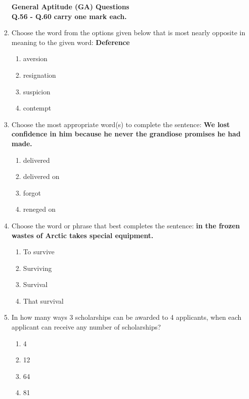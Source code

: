 \documentclass{article}
\begin{document}
\begin{enumerate}
\textbf{General Aptitude (GA) Questions}\\

\textbf{Q.56 - Q.60 carry one mark each.}


\item Choose the word from the options given below that is most nearly opposite in meaning to the given word: \textbf{Deference}
\begin{enumerate}
\item aversion
\item resignation
\item suspicion
\item contempt
\end{enumerate}

\item Choose the most appropriate word(s) to complete the sentence: \textbf{We lost confidence in him because he never \underline{\hspace{2cm}} the grandiose promises he had made.}
\begin{enumerate}
\item delivered
\item delivered on
\item forgot
\item reneged on
\end{enumerate}

\item Choose the word or phrase that best completes the sentence: \underline{\hspace{2.5cm}} \textbf{in the frozen wastes of Arctic takes special equipment.}
\begin{enumerate}
\item To survive
\item Surviving
\item Survival
\item That survival
\end{enumerate}

\item In how many ways 3 scholarships can be awarded to 4 applicants, when each applicant can receive any number of scholarships?
\begin{multicols}{4}
\begin{enumerate}
\item 4
\item 12
\item 64
\item 81
\end{enumerate}
\end{multicols}


\end{enumerate}
\end{document}
